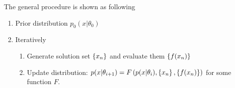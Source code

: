 \documentclass{article}
\begin{document}
The general procedure is shown as following
\begin{enumerate}
    \item Prior distribution $p_0(x|\theta_0)$
    \item Iteratively
        \begin{enumerate}
            \item Generate solution set $\left\{ {x_n} \right\}$ and evaluate them $\left\{ {f(x_n)} \right\}$
            \item Update distribution: $p(x|\theta_{i+1})=F\left( {p(x|\theta_i), \left\{ {x_n} \right\}, \left\{ {f(x_n)} \right\}} \right)$ for some function $F$. 
        \end{enumerate}
\end{enumerate}

\printbibliography
\end{document}
